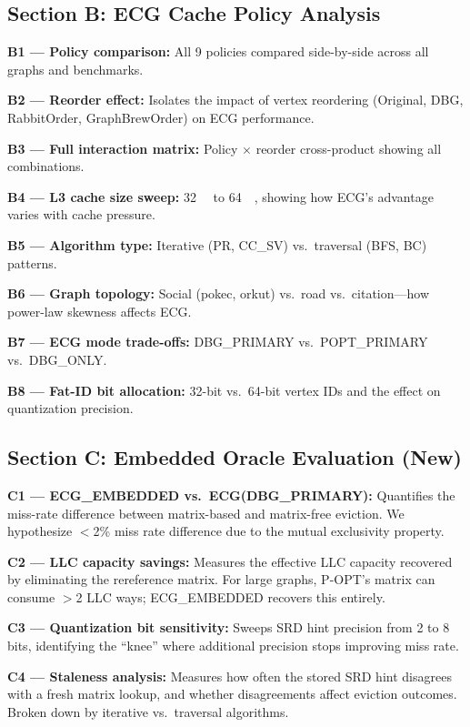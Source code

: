 \documentclass[conference]{IEEEtran}
\begin{document}
\subsection{Section B: ECG Cache Policy Analysis}

\textbf{B1 --- Policy comparison:} All 9 policies compared side-by-side across all graphs and benchmarks.

\textbf{B2 --- Reorder effect:} Isolates the impact of vertex reordering (Original, DBG, RabbitOrder, GraphBrewOrder) on ECG performance.

\textbf{B3 --- Full interaction matrix:} Policy $\times$ reorder cross-product showing all combinations.

\textbf{B4 --- L3 cache size sweep:} \SI{32}{\kilo\byte} to \SI{64}{\mega\byte}, showing how ECG's advantage varies with cache pressure.

\textbf{B5 --- Algorithm type:} Iterative (PR, CC\_SV) vs.\ traversal (BFS, BC) patterns.

\textbf{B6 --- Graph topology:} Social (pokec, orkut) vs.\ road vs.\ citation---how power-law skewness affects ECG.

\textbf{B7 --- ECG mode trade-offs:} DBG\_PRIMARY vs.\ POPT\_PRIMARY vs.\ DBG\_ONLY.

\textbf{B8 --- Fat-ID bit allocation:} 32-bit vs.\ 64-bit vertex IDs and the effect on quantization precision.

\subsection{Section C: Embedded Oracle Evaluation (New)}

\textbf{C1 --- ECG\_EMBEDDED vs.\ ECG(DBG\_PRIMARY):} Quantifies the miss-rate difference between matrix-based and matrix-free eviction. We hypothesize $<$2\% miss rate difference due to the mutual exclusivity property.

\textbf{C2 --- LLC capacity savings:} Measures the effective LLC capacity recovered by eliminating the rereference matrix. For large graphs, P-OPT's matrix can consume $>$2 LLC ways; ECG\_EMBEDDED recovers this entirely.

\textbf{C3 --- Quantization bit sensitivity:} Sweeps SRD hint precision from 2 to 8 bits, identifying the ``knee'' where additional precision stops improving miss rate.

\textbf{C4 --- Staleness analysis:} Measures how often the stored SRD hint disagrees with a fresh matrix lookup, and whether disagreements affect eviction outcomes. Broken down by iterative vs.\ traversal algorithms.
\end{document}
